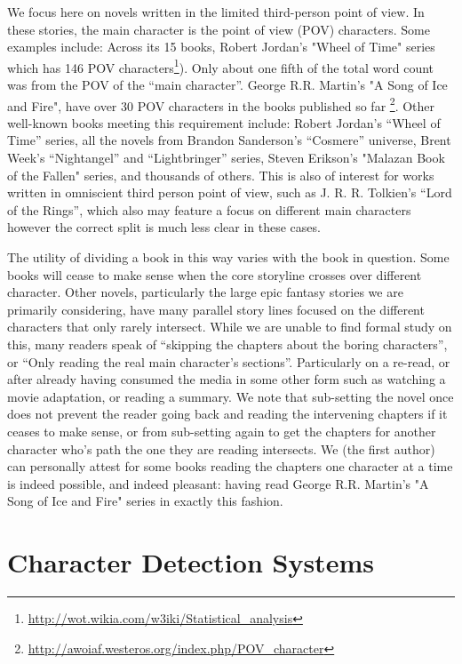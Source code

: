 \documentclass[11pt,a4paper]{article}
\begin{document}
We focus here on novels written in the limited third-person point of view.
In these stories, the main character is the point of view (POV) characters.
Some examples include: 
Across its 15 books, Robert Jordan's "Wheel of Time" series which has 146 POV characters\footnote{\url{http://wot.wikia.com/w3iki/Statistical_analysis}}). Only about one fifth of the total word count was from the POV of the ``main character''.
George R.R. Martin's "A Song of Ice and Fire", have over 30 POV characters in the books published so far \footnote{\url{http://awoiaf.westeros.org/index.php/POV_character}}.
Other well-known books meeting this requirement include:
Robert Jordan's ``Wheel of Time'' series, all the novels from Brandon Sanderson's ``Cosmere'' universe, Brent Week's ``Nightangel'' and ``Lightbringer'' series,
Steven Erikson's "Malazan Book of the Fallen" series, and thousands of others.
This is also of interest for works written in omniscient third person point of view, such as J. R. R. Tolkien's ``Lord of the Rings'',
which also may feature a focus on different main characters however the correct split is much less clear in these cases.

The utility of dividing a book in this way varies with the book in question.
Some books will cease to make sense when the core storyline crosses over different character.
Other novels, particularly the large epic fantasy stories we are primarily considering,
have many parallel story lines focused on the different characters that only rarely intersect.
While we are unable to find formal study on this, 
many readers speak of ``skipping the chapters about the boring characters'',
or ``Only reading the real main character's sections''.
Particularly on a re-read, or after already having consumed the media in some other form such as watching a movie adaptation, or reading a summary.
We note that sub-setting the novel once does not prevent the reader going back and reading the intervening chapters if it ceases to make sense, or from sub-setting again to get the chapters for another character who's path the one they are reading intersects.
We (the first author) can personally attest for some books reading the chapters one character at a time is indeed possible, and indeed pleasant: having read George R.R. Martin's "A Song of Ice and Fire" series in exactly this fashion.






\section{Character Detection Systems}
\end{document}
